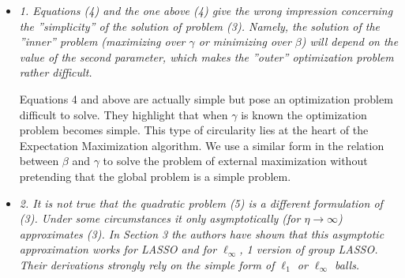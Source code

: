 \documentclass[a4paper,11pt]{texMemo}
\begin{document}
\begin{itemize}

\item 
\emph{1. Equations (4) and the one above (4) give the wrong impression
  concerning the ''simplicity'' of the solution of problem (3).  Namely,
  the solution of the ''inner'' problem (maximizing over $\gamma$ or minimizing
  over $\beta$) will depend on the value of the second parameter, which
  makes the ''outer'' optimization problem rather difficult.
}

Equations 4 and above are actually simple but pose an optimization problem difficult to solve. They highlight that when $\gamma$ is known the optimization problem becomes simple. This type of circularity  lies at the heart of the Expectation Maximization algorithm. We use a similar  form in the  relation between $\beta$ and $\gamma$ to solve the problem of external maximization without pretending that the global problem is a simple problem.







\item
  \emph{2.  It is not true that the quadratic problem (5) is a
    different formulation of (3).
    Under some circumstances it only asymptotically (for
    $\eta \rightarrow \infty$) approximates (3).  In Section 3 the
    authors have shown that this asymptotic approximation works for
    LASSO and for $\ell_\infty$, 1 version of group LASSO. Their
    derivations strongly rely on the simple form of $\ell_1$ or
    $\ell_\infty$ balls.
  }


\end{itemize}
\end{document}
